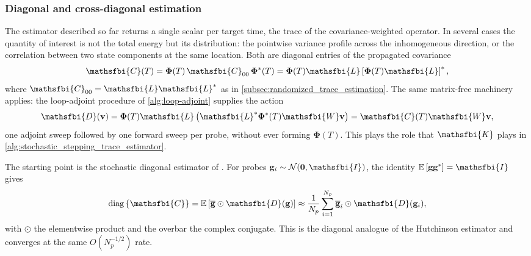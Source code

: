 \subsubsection{Diagonal and cross-diagonal estimation}
\label{sec:appendix_verification_diagonal}

The estimator described so far returns a single scalar per target time, the trace of the
covariance-weighted operator. In several cases the quantity of interest is not the total energy but
its distribution: the pointwise variance profile across the inhomogeneous direction, or the
correlation between two state components at the same location. Both are diagonal entries of the
propagated covariance
\begin{equation}
  \mathsfbi{C}(T)
  =
  \boldsymbol{\Phi}(T)\,\mathsfbi{C}_{00}\,\boldsymbol{\Phi}^{*}(T)
  =
  \boldsymbol{\Phi}(T)\mathsfbi{L}
  \left[\boldsymbol{\Phi}(T)\mathsfbi{L}\right]^{*},
  \label{eq:diag_propagated_covariance}
\end{equation}
where \(\mathsfbi{C}_{00}=\mathsfbi{L}\mathsfbi{L}^{*}\) as in
\cref{subsec:randomized_trace_estimation}. The same matrix-free machinery applies: the loop-adjoint
procedure of \cref{alg:loop-adjoint} supplies the action
\begin{equation}
  \mathsfbi{D}(\mathbf{v})
  =
  \boldsymbol{\Phi}(T)\mathsfbi{L}
  \left(
    \mathsfbi{L}^{*}\boldsymbol{\Phi}^{*}(T)\mathsfbi{W}\mathbf{v}
  \right)
  =
  \mathsfbi{C}(T)\mathsfbi{W}\mathbf{v},
  \label{eq:diag_kernel}
\end{equation}
one adjoint sweep followed by one forward sweep per probe, without ever forming
\(\boldsymbol{\Phi}(T)\). This plays the role that \(\mathsfbi{K}\) plays in
\cref{alg:stochastic_stepping_trace_estimator}.

The starting point is the stochastic diagonal estimator of
\citet{bekas-kokiopoulou-saad-2007}. For probes \(\mathbf{g}_i\sim\mathcal{N}(\mathbf{0},\mathsfbi{I})\),
the identity \(\mathbb{E}\left[\mathbf{g}\mathbf{g}^{*}\right]=\mathsfbi{I}\) gives
\begin{equation}
  \mathrm{diag}\left\{\mathsfbi{C}\right\}
  =
  \mathbb{E}\left[
    \overline{\mathbf{g}}\odot\mathsfbi{D}(\mathbf{g})
  \right]
  \approx
  \frac{1}{N_p}\sum_{i=1}^{N_p}
  \overline{\mathbf{g}}_i\odot\mathsfbi{D}(\mathbf{g}_i),
  \label{eq:diag_hutchinson}
\end{equation}
with \(\odot\) the elementwise product and the overbar the complex conjugate. This is the diagonal
analogue of the Hutchinson estimator and converges at the same \(O(N_p^{-1/2})\) rate.

